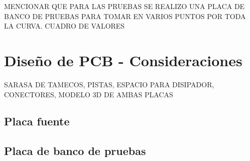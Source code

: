 MENCIONAR QUE PARA LAS PRUEBAS SE REALIZO UNA PLACA DE BANCO DE PRUEBAS PARA TOMAR EN VARIOS PUNTOS POR TODA LA CURVA.
CUADRO DE VALORES

\section{Dise\~no de PCB - Consideraciones}

SARASA DE TAMECOS, PISTAS, ESPACIO PARA DISIPADOR, CONECTORES, MODELO 3D DE AMBAS PLACAS

\subsection{Placa fuente}

\subsection{Placa de banco de pruebas}

